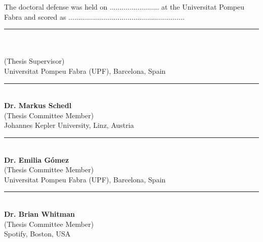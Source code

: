 
\newcommand\advisor[2]{
	\vspace{1.3cm}
	\begin{center}
		\rule{6cm}{0.8pt}\\
		\textbf{#1}\\
		(Thesis Supervisor)\\
		#2
	\end{center}
}
\newcommand\member[2]{
	\vspace{1.3cm}
	\begin{center}
		\rule{6cm}{0.8pt}\\
		\textbf{#1}\\
		(Thesis Committee Member) \\
		#2
	\end{center}
} 

\vspace{1cm}
\noindent The doctoral defense was held on ......................... at the Universitat Pompeu Fabra and scored as ...........................................................\par
\vspace{2cm}
\advisor{\supervisor}{Universitat Pompeu Fabra (UPF), Barcelona, Spain}
\vspace*{0.3cm}

\member{Dr. Markus Schedl}{Johannes Kepler University, Linz, Austria}
\member{Dr. Emilia G{\'o}mez}{Universitat Pompeu Fabra (UPF), Barcelona, Spain}
\member{Dr. Brian Whitman}{Spotify, Boston, USA}